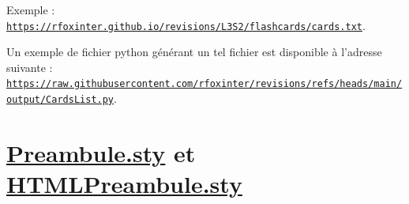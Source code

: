 \documentclass[a4paper,12pt]{article}
\let\oldsection\section
\newcommand{\ssection}[2][]{\clearpage\oldsection[#1]{#2}}
\begin{document}
Exemple : \href{https://rfoxinter.github.io/revisions/L3S2/flashcards/cards.txt}{\texttt{https://rfoxinter.github.io/revisions/L3S2/flashcards/cards.txt}}.

Un exemple de fichier python générant un tel fichier est disponible à l'adresse suivante : \href{https://raw.githubusercontent.com/rfoxinter/revisions/refs/heads/main/output/CardsList.py}{\texttt{https://raw.githubusercontent.com/rfoxinter/revisions/refs/heads/main/}}\\\null\hfill\href{https://raw.githubusercontent.com/rfoxinter/revisions/refs/heads/main/output/CardsList.py}{\texttt{output/CardsList.py}}.
\ssection[Preambule.sty et HTMLPreambule.sty]{\href{https://raw.githubusercontent.com/rfoxinter/revisions/refs/heads/main/output/output/Preambule.sty}{\color{black}Preambule.sty} et \href{https://raw.githubusercontent.com/rfoxinter/revisions/refs/heads/main/output/output/HTMLPreambule.sty}{\color{black}HTMLPreambule.sty}}
\end{document}
